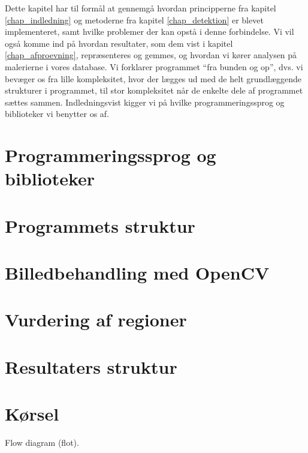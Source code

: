 {
{\sffamily Dette kapitel har til formål at gennemgå hvordan principperne
fra kapitel \ref{chap_indledning} og metoderne fra kapitel
\ref{chap_detektion} er blevet implementeret, samt hvilke problemer der
kan opstå i denne forbindelse. Vi vil også komme ind på hvordan
resultater, som dem vist i kapitel \ref{chap_afproevning}, repræsenteres
og gemmes, og hvordan vi kører analysen på malerierne i vores database.
Vi forklarer programmet ``fra bunden og op'', dvs. vi bevæger os fra
lille kompleksitet, hvor der lægges ud med de helt grundlæggende
strukturer i programmet, til stor kompleksitet når de enkelte dele af
programmet sættes sammen.  Indledningsvist kigger vi på hvilke
programmeringssprog og biblioteker vi benytter os af.
}

\section{Programmeringssprog og biblioteker\label{section_programmeringssprog}}


\section{Programmets struktur\label{section_struktur}}


\section{Billedbehandling med OpenCV\label{section_impBilledbehandling}}


\section{Vurdering af regioner\label{section_vurdering_regioner}}


\section{Resultaters struktur\label{section_resultat_struktur}}


\section{Kørsel\label{section_koersel}}
Flow diagram (flot).
}
